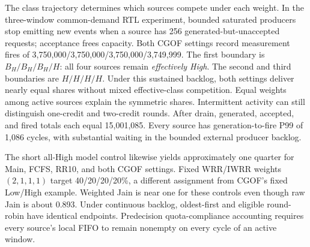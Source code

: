 The class trajectory determines which sources compete under each weight. In the three-window common-demand RTL experiment, bounded saturated producers stop emitting new events when a source has 256 generated-but-unaccepted requests; acceptance frees capacity. Both CGOF settings record measurement fires of 3,750,000/3,750,000/3,750,000/3,749,999. The first boundary is $B_H/B_H/B_H/H$: all four sources remain \emph{effectively High}. The second and third boundaries are $H/H/H/H$. Under this sustained backlog, both settings deliver nearly equal shares without mixed effective-class competition. Equal weights among active sources explain the symmetric shares. Intermittent activity can still distinguish one-credit and two-credit rounds. After drain, generated, accepted, and fired totals each equal 15,001,085. Every source has generation-to-fire P99 of 1,086 cycles, with substantial waiting in the bounded external producer backlog.

The short all-High model control likewise yields approximately one quarter for Main, FCFS, RR10, and both CGOF settings. Fixed WRR/IWRR weights $(2,1,1,1)$ target 40/20/20/20\%, a different assignment from CGOF's fixed Low/High example. Weighted Jain is near one for these controls even though raw Jain is about 0.893. Under continuous backlog, oldest-first and eligible round-robin have identical endpoints. Predecision quota-compliance accounting requires every source's local FIFO to remain nonempty on every cycle of an active window.

